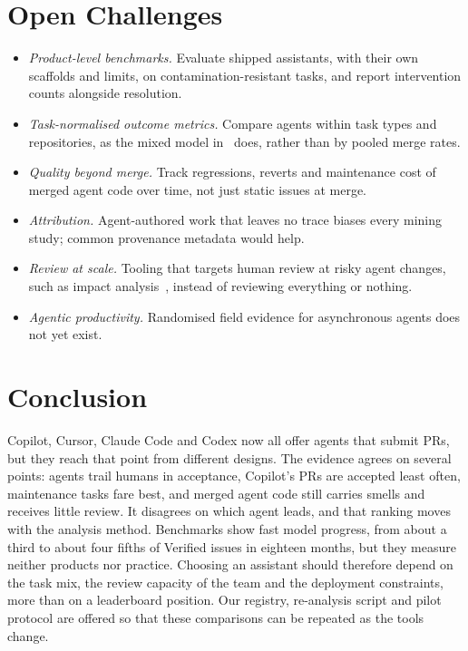 \documentclass[conference]{IEEEtran}
\begin{document}
\section{Open Challenges}

\begin{itemize}
\item \emph{Product-level benchmarks.} Evaluate shipped assistants, with their own scaffolds and limits,
on contamination-resistant tasks, and report intervention counts alongside resolution.
\item \emph{Task-normalised outcome metrics.} Compare agents within task types and repositories, as the
mixed model in~\cite{mazloomzadeh2026} does, rather than by pooled merge rates.
\item \emph{Quality beyond merge.} Track regressions, reverts and maintenance cost of merged agent code
over time, not just static issues at merge.
\item \emph{Attribution.} Agent-authored work that leaves no trace biases every mining study; common
provenance metadata would help.
\item \emph{Review at scale.} Tooling that targets human review at risky agent changes, such as impact
analysis~\cite{alonso2026tdad}, instead of reviewing everything or nothing.
\item \emph{Agentic productivity.} Randomised field evidence for asynchronous agents does not yet exist.
\end{itemize}

\section{Conclusion}

Copilot, Cursor, Claude Code and Codex now all offer agents that submit PRs, but they reach that point from
different designs. The evidence agrees on several points: agents trail humans in acceptance, Copilot's PRs
are accepted least often, maintenance tasks fare best, and merged agent code still carries smells and
receives little review. It disagrees on which agent leads, and that ranking moves with the analysis method.
Benchmarks show fast model progress, from about a third to about four fifths of Verified issues in
eighteen months, but they measure neither products nor practice. Choosing an assistant
should therefore depend on the task mix, the review capacity of the team and the deployment constraints,
more than on a leaderboard position. Our registry, re-analysis script and pilot protocol are offered so
that these comparisons can be repeated as the tools change.



\end{document}
